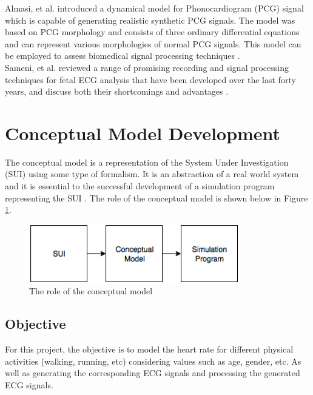 \documentclass[paper=a4, fontsize=11pt]{scrartcl}
\numberwithin{equation}{section}		%
\numberwithin{figure}{section}			%
\numberwithin{table}{section}		    %
\begin{document}
Almasi, et al. introduced a dynamical model for Phonocardiogram (PCG) signal which is capable of 
generating realistic synthetic PCG signals. The model was based on PCG morphology and consists of 
three ordinary differential equations and can represent various morphologies of normal PCG signals. 
This model can be employed to assess biomedical signal processing techniques
\cite{almasi2011dynamical}.\\

Sameni, et al. reviewed a range of promising recording and signal processing techniques for fetal 
ECG analysis that have been developed over the last forty years, and discuss both their shortcomings 
and advantages \cite{sameni2010review}.

\section{Conceptual Model Development} \label{sec:model}
The conceptual model is a representation of the System Under Investigation (SUI) using some type of 
formalism. It is an abstraction of a real world system and it is essential to the successful 
development of a simulation program representing the SUI \cite{robinson2013conceptual}. The role of 
the conceptual model is shown below in Figure \ref{fig:01}. \\
	
\begin{figure}[H]
	\begin{center} 
		\includegraphics[height=1in,width=3.6in]{sui_mod_sim} 
		\caption{The role of the conceptual model\label{fig:01}} 
	\end{center} 
\end{figure}

\subsection{Objective} \label{sec:model_obj}
For this project, the objective is to model the heart rate for different physical activities 
(walking, running, etc) considering values such as age, gender, etc. As well as generating the
corresponding ECG signals and processing the generated ECG signals.
\end{document}
